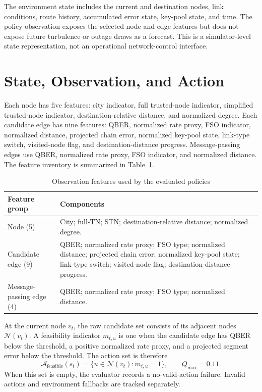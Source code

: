 \documentclass[12pt,a4paper,oneside]{report}
\begin{document}
The environment state includes the current and destination nodes, link conditions, route history, accumulated error state, key-pool state, and time. The policy observation exposes the selected node and edge features but does not expose future turbulence or outage draws as a forecast. This is a simulator-level state representation, not an operational network-control interface.

\section{State, Observation, and Action}
Each node has five features: city indicator, full trusted-node indicator, simplified trusted-node indicator, destination-relative distance, and normalized degree. Each candidate edge has nine features: QBER, normalized rate proxy, FSO indicator, normalized distance, projected chain error, normalized key-pool state, link-type switch, visited-node flag, and destination-distance progress. Message-passing edges use QBER, normalized rate proxy, FSO indicator, and normalized distance. The feature inventory is summarized in Table~\ref{tab:observations}.

\begin{table}[htbp]
\centering
\caption{Observation features used by the evaluated policies}
\label{tab:observations}
\begin{tabular}{@{}p{1.3in}p{4.8in}@{}}
\toprule
Feature group & Components \\
\midrule
Node (5) & City; full-TN; STN; destination-relative distance; normalized degree. \\
Candidate edge (9) & QBER; normalized rate proxy; FSO type; normalized distance; projected chain error; normalized key-pool state; link-type switch; visited-node flag; destination-distance progress. \\
Message-passing edge (4) & QBER; normalized rate proxy; FSO type; normalized distance. \\
\bottomrule
\end{tabular}
\end{table}

At the current node $v_t$, the raw candidate set consists of its adjacent nodes $\mathcal{N}(v_t)$. A feasibility indicator $m_{t,u}$ is one when the candidate edge has QBER below the threshold, a positive normalized rate proxy, and a projected segment error below the threshold. The action set is therefore
\begin{equation}
\mathcal{A}_{\mathrm{feasible}}(s_t)
=\{u\in\mathcal{N}(v_t):m_{t,u}=1\},\qquad Q_{\max}=0.11.
\label{eq:feasible}
\end{equation}
When this set is empty, the evaluator records a no-valid-action failure. Invalid actions and environment fallbacks are tracked separately.
\end{document}

